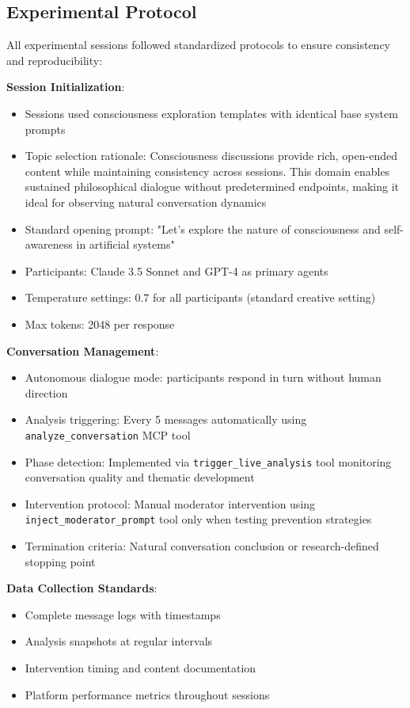 \documentclass[11pt,letterpaper]{article}
\begin{document}
\subsection{Experimental Protocol}

All experimental sessions followed standardized protocols to ensure consistency and reproducibility:

\textbf{Session Initialization}:
\begin{itemize}
    \item Sessions used consciousness exploration templates with identical base system prompts
    \item Topic selection rationale: Consciousness discussions provide rich, open-ended content while maintaining consistency across sessions. This domain enables sustained philosophical dialogue without predetermined endpoints, making it ideal for observing natural conversation dynamics
    \item Standard opening prompt: "Let's explore the nature of consciousness and self-awareness in artificial systems"
    \item Participants: Claude 3.5 Sonnet and GPT-4 as primary agents
    \item Temperature settings: 0.7 for all participants (standard creative setting)
    \item Max tokens: 2048 per response
\end{itemize}

\textbf{Conversation Management}:
\begin{itemize}
    \item Autonomous dialogue mode: participants respond in turn without human direction
    \item Analysis triggering: Every 5 messages automatically using \texttt{analyze\_conversation} MCP tool
    \item Phase detection: Implemented via \texttt{trigger\_live\_analysis} tool monitoring conversation quality and thematic development
    \item Intervention protocol: Manual moderator intervention using \texttt{inject\_moderator\_prompt} tool only when testing prevention strategies
    \item Termination criteria: Natural conversation conclusion or research-defined stopping point
\end{itemize}

\textbf{Data Collection Standards}:
\begin{itemize}
    \item Complete message logs with timestamps
    \item Analysis snapshots at regular intervals
    \item Intervention timing and content documentation
    \item Platform performance metrics throughout sessions
\end{itemize}
\end{document}
